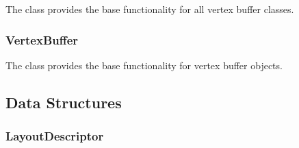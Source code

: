 \documentclass[a4paper,10pt,english,openany,oneside]{sphinxmanual}
\begin{document}
\sphinxAtStartPar
The  class provides the base functionality for all vertex buffer classes.


\subsubsection{VertexBuffer}
\label{\detokenize{api/buffers:vertexbuffer}}
\sphinxAtStartPar
The  class provides the base functionality for vertex buffer objects.


\subsection{Data Structures}
\label{\detokenize{api/buffers:data-structures}}

\subsubsection{LayoutDescriptor}
\label{\detokenize{api/buffers:layoutdescriptor}}
\end{document}
